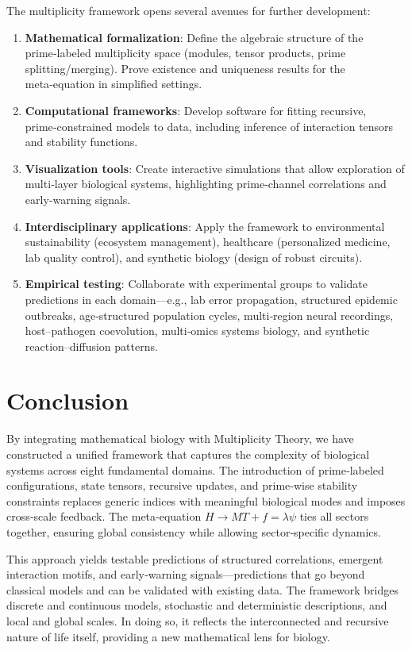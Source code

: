 \documentclass[11pt]{article}
\begin{document}
The multiplicity framework opens several avenues for further development:
\begin{enumerate}
    \item \textbf{Mathematical formalization}: Define the algebraic structure of the prime‑labeled multiplicity space (modules, tensor products, prime splitting/merging). Prove existence and uniqueness results for the meta‑equation in simplified settings.
    \item \textbf{Computational frameworks}: Develop software for fitting recursive, prime‑constrained models to data, including inference of interaction tensors and stability functions.
    \item \textbf{Visualization tools}: Create interactive simulations that allow exploration of multi‑layer biological systems, highlighting prime‑channel correlations and early‑warning signals.
    \item \textbf{Interdisciplinary applications}: Apply the framework to environmental sustainability (ecosystem management), healthcare (personalized medicine, lab quality control), and synthetic biology (design of robust circuits).
    \item \textbf{Empirical testing}: Collaborate with experimental groups to validate predictions in each domain—e.g., lab error propagation, structured epidemic outbreaks, age‑structured population cycles, multi‑region neural recordings, host–pathogen coevolution, multi‑omics systems biology, and synthetic reaction–diffusion patterns.
\end{enumerate}

\section{Conclusion}
\label{sec:conclusion}

By integrating mathematical biology with Multiplicity Theory, we have constructed a unified framework that captures the complexity of biological systems across eight fundamental domains. The introduction of prime‑labeled configurations, state tensors, recursive updates, and prime‑wise stability constraints replaces generic indices with meaningful biological modes and imposes cross‑scale feedback. The meta‑equation \(H \to M T + f = \lambda \psi\) ties all sectors together, ensuring global consistency while allowing sector‑specific dynamics.

This approach yields testable predictions of structured correlations, emergent interaction motifs, and early‑warning signals—predictions that go beyond classical models and can be validated with existing data. The framework bridges discrete and continuous models, stochastic and deterministic descriptions, and local and global scales. In doing so, it reflects the interconnected and recursive nature of life itself, providing a new mathematical lens for biology.

\end{document}
